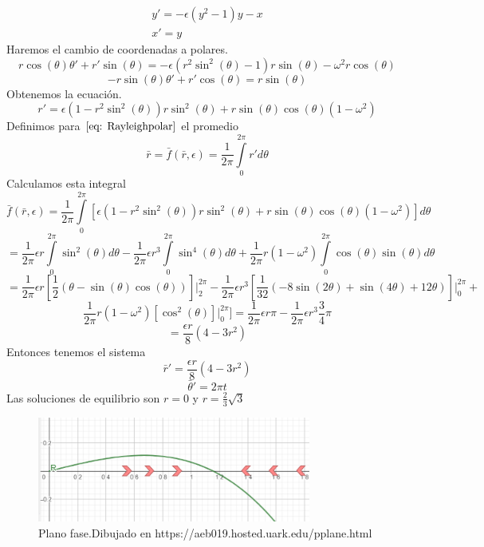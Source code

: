 \documentclass[12pt, a4paper]{report}
\begin{document}
\begin{equation}\label{eq: Rayleigh}
	\begin{matrix}
		y'=-\epsilon(y^2-1)y-x \\
		x'=y
	\end{matrix}
\end{equation}
Haremos el cambio de coordenadas a polares.
$$r\cos(\theta)\theta'+r'\sin(\theta)=-\epsilon (r^2\sin^2(\theta)-1)r\sin(\theta)-\omega^2r\cos(\theta) $$
$$-r\sin(\theta)\theta'+r'\cos(\theta)=r\sin(\theta)$$
Obtenemos la ecuación.
\begin{equation}\label{eq: Rayleighpolar}
	r'=\epsilon(1-r^2\sin^2(\theta))r\sin^2(\theta)+r\sin(\theta)\cos(\theta)(1-\omega^2)
\end{equation}
Definimos para $\eqref{eq: Rayleighpolar}$ el promedio
$$\bar{r}=\bar{f}(\bar{r},\epsilon)=\frac{1}{2\pi}\int\limits_0^{2\pi}r'd\theta$$
Calculamos esta integral
$$\bar{f}(\bar{r},\epsilon)=\frac{1}{2\pi}\int\limits_0^{2\pi}[\epsilon(1-r^2\sin^2(\theta))r\sin^2(\theta)+r\sin(\theta)\cos(\theta)(1-\omega^2)]d\theta$$
$$=\frac{1}{2\pi}\epsilon r\int\limits_0^{2\pi}\sin^2(\theta)d\theta-\frac{1}{2\pi}\epsilon r^3\int\limits_0^{2\pi}\sin^4(\theta)d\theta+\frac{1}{2\pi}r(1-\omega^2)\int\limits_0^{2\pi}\cos(\theta)\sin(\theta)d\theta$$
$$=\frac{1}{2\pi}\epsilon r[\frac{1}{2}(\theta-\sin(\theta)\cos(\theta))]\Big|_2^{2\pi}-\frac{1}{2\pi}\epsilon r^3[\frac{1}{32}(-8\sin(2\theta)+\sin(4\theta)+12\theta)]\Big|_0^{2\pi}+$$
$$\frac{1}{2\pi}r(1-\omega^2)[\cos^2(\theta)]\Big|_0^{2\pi}]=\frac{1}{2\pi}\epsilon r\pi-\frac{1}{2\pi}\epsilon r^3\frac{3}{4}\pi$$
$$=\frac{\epsilon r}{8}(4-3r^2)$$
Entonces tenemos el sistema
$$\bar{r}'=\frac{\epsilon r}{8}(4-3r^2)$$
$$\bar{\theta}'=2\pi t$$
Las soluciones de equilibrio son $r=0$ y $r=\frac{2}{3}\sqrt{3}$
\begin{figure}[h]
	\centering
	\includegraphics[width=9cm]{graficarayleigh.png}
	\caption{Plano fase.Dibujado en https://aeb019.hosted.uark.edu/pplane.html}
\end{figure}
\end{document}

